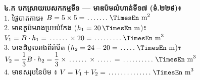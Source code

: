 \documentclass[a4paper,10pt]{article}
\newcommand{\en}[1]{{\TimesEn #1}}
\newcommand{\unit}[1]{\,\text{\en{#1}}}
\newcommand{\cnum}[1]{\mbox{\fontsize{10pt}{12pt}\selectfont\ding{\numexpr181+#1\relax}}}
\newcommand{\blank}[1]{\makebox[#1]{\dotfill}}
\begin{document}
\noindent
\begin{minipage}[t]{10.1cm}\vspace{0pt}
  \begin{tcolorbox}[
    enhanced, sharp corners, colback=white, colframe=black, equal height group=rowE5,
    boxrule=0.85pt, boxsep=3.5pt, top=7.5pt, bottom=7.5pt, left=5.5pt, right=5.5pt
  ]\raggedright
    \textbf{៤.ក បកស្រាយបេសកកម្មទី១ — មាឌប៉មលំហាត់ទី១៧ (ទំ.២២៩)៖}\\[5.5pt]
    $1.$ ផ្ទៃបាតការេ៖ $B = 5\times 5 = \blank{1.1cm}\unit{m}^2$\\[5pt]
    $2.$ មាឌតួប៉មរាងប្រអប់កែង ($h_1 = 20\unit{m}$)៖\\[3.5pt]
    \hspace*{0.15cm}$V_1 = B \cdot h_1 = \blank{1.0cm} \times 20 = \blank{1.4cm}\unit{m}^3$\\[5pt]
    $3.$ មាឌដំបូលរាងពីរ៉ាមីត ($h_2 = 24 - 20 = \blank{0.8cm}\unit{m}$)៖\\[3.5pt]
    \hspace*{0.15cm}$V_2 = \dfrac{1}{3} B \cdot h_2 = \dfrac{1}{3}\times \blank{1.0cm}\times \blank{0.8cm} = \blank{1.6cm}\unit{m}^3$\\[5pt]
    $4.$ មាឌសរុបនៃប៉ម \cnum{4}៖ $V = V_1 + V_2 = \blank{2.2cm}\unit{m}^3$
  \end{tcolorbox}
\end{minipage}%
\hfill
\end{document}
